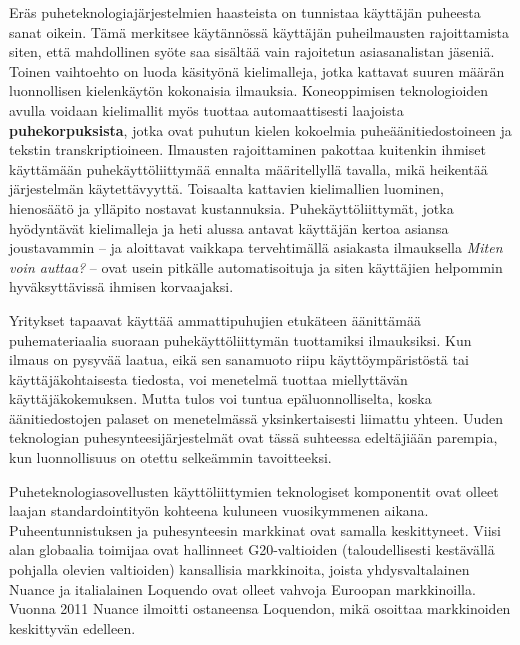 \begin{multicols}{2}
  Eräs puheteknologiajärjestelmien haasteista on tunnistaa käyttäjän puheesta sanat oikein. Tämä merkitsee käytännössä käyttäjän puheilmausten rajoittamista siten, että mahdollinen syöte saa sisältää vain rajoitetun asiasanalistan jäseniä. Toinen vaihtoehto on luoda käsityönä kielimalleja, jotka kattavat suuren määrän luonnollisen kielenkäytön kokonaisia ilmauksia. Koneoppimisen teknologioiden avulla voidaan kielimallit myös tuottaa automaattisesti laajoista \textbf{puhekorpuksista}, jotka ovat puhutun kielen kokoelmia puheäänitiedostoineen ja tekstin transkriptioineen. Ilmausten rajoittaminen pakottaa kuitenkin ihmiset käyttämään puhekäyttöliittymää ennalta määritellyllä tavalla, mikä heikentää järjestelmän käytettävyyttä. Toisaalta kattavien kielimallien luominen, hienosäätö ja ylläpito nostavat kustannuksia. Puhekäyttöliittymät, jotka hyödyntävät kielimalleja ja heti alussa antavat käyttäjän kertoa asiansa joustavammin -- ja aloittavat vaikkapa tervehtimällä asiakasta ilmauksella \textit{Miten voin auttaa?} -- ovat usein pitkälle automatisoituja ja siten käyttäjien helpommin hyväksyttävissä ihmisen korvaajaksi.

  Yritykset tapaavat käyttää ammattipuhujien etukäteen äänittämää puhemateriaalia suoraan puhekäyttöliittymän tuottamiksi ilmauksiksi. Kun ilmaus on pysyvää laatua, eikä sen sanamuoto riipu käyttöympäristöstä tai käyttäjäkohtaisesta tiedosta, voi menetelmä tuottaa miellyttävän käyttäjäkokemuksen. Mutta tulos voi tuntua epäluonnolliselta, koska äänitiedostojen palaset on menetelmässä yksinkertaisesti liimattu yhteen.  Uuden teknologian puhesynteesijärjestelmät ovat tässä suhteessa edeltäjiään parempia, kun luonnollisuus on otettu selkeämmin tavoitteeksi.

  Puheteknologiasovellusten käyttöliittymien teknologiset komponentit ovat olleet laajan standardointityön kohteena kuluneen vuosikymmenen aikana. Puheentunnistuksen ja puhesynteesin markkinat ovat samalla keskittyneet.  Viisi alan globaalia toimijaa ovat hallinneet G20-valtioiden (taloudellisesti kestävällä pohjalla olevien valtioiden) kansallisia markkinoita, joista yhdysvaltalainen Nuance ja italialainen Loquendo ovat olleet vahvoja Euroopan markkinoilla. Vuonna 2011 Nuance ilmoitti ostaneensa Loquendon, mikä osoittaa markkinoiden keskittyvän edelleen.


\end{multicols}
